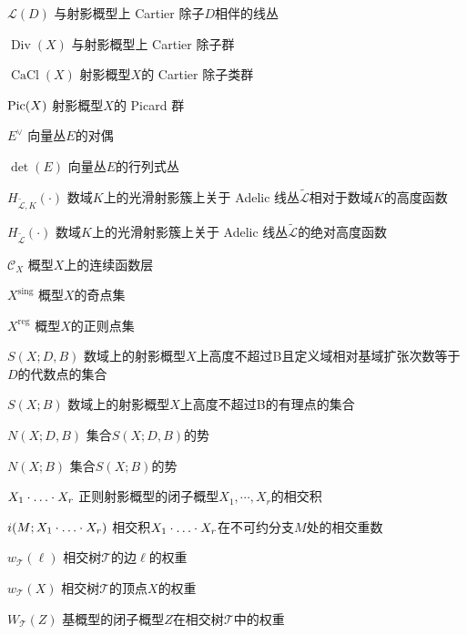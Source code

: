 \begin{denotation}[3cm]
\item[$\mathscr{L}(D)$] 与射影概型上 Cartier 除子$D$相伴的线丛
\item[$\operatorname{Div}(X)$] 与射影概型上 Cartier 除子群
\item[$\operatorname{CaCl}(X)$] 射影概型$X$的 Cartier 除子类群
\item[$\operatorname{Pic}(X)$] 射影概型$X$的 Picard 群
\item[$E^{\vee}$] 向量丛$E$的对偶
\item[$\det(E)$] 向量丛$E$的行列式丛
\item[$H_{\widetilde{\mathscr{L}}, K}(\cdot)$] 数域$K$上的光滑射影簇上关于 Adelic 线丛$\widetilde{\mathscr{L}}$相对于数域$K$的高度函数
\item[$H_{\widetilde{\mathscr{L}}}(\cdot)$] 数域$K$上的光滑射影簇上关于 Adelic 线丛$\widetilde{\mathscr{L}}$的绝对高度函数
\item[$\mathscr{C}_X$] 概型$X$上的连续函数层
\item[$X^{\mathrm{sing}}$] 概型$X$的奇点集
\item[$X^{\mathrm{reg}}$] 概型$X$的正则点集
\item[$S(X;D,B)$] 数域上的射影概型$X$上高度不超过B且定义域相对基域扩张次数等于$D$的代数点的集合
\item[$S(X;B)$] 数域上的射影概型$X$上高度不超过B的有理点的集合
\item[$N(X;D,B)$] 集合$S(X;D,B)$的势
\item[$N(X;B)$] 集合$S(X;B)$的势
\item[$X_1\cdot\ldots\cdot X_r$] 正则射影概型的闭子概型$X_1,\cdots,X_r$的相交积
\item[$i(M;X_1\cdot\ldots\cdot X_r)$] 相交积$X_1\cdot\ldots\cdot X_r$在不可约分支$M$处的相交重数
\item[$w_{\mathscr{T}}(\ell)$] 相交树$\mathscr{T}$的边$\ell$的权重
\item[$w_{\mathscr{T}}(X)$] 相交树$\mathscr{T}$的顶点$X$的权重
\item[$W_{\mathscr{T}}(Z)$] 基概型的闭子概型$Z$在相交树$\mathscr{T}$中的权重
\end{denotation}

